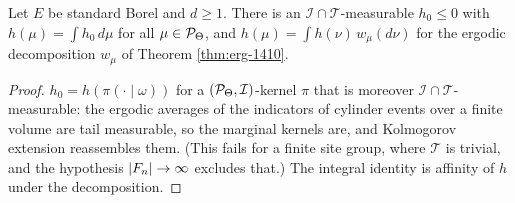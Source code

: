 \begin{theorem}[Georgii (15.20)]
    \label{thm:sent-15-20}
    \leanok

    Let $E$ be standard Borel and $d \geq 1$. There is an
    $\mathcal I \cap \mathcal T$-measurable $h_0 \leq 0$ with $h(\mu) = \int h_0\,d\mu$ for all
    $\mu \in \mathcal{P}_\Theta$, and $h(\mu) = \int h(\nu)\,w_\mu(d\nu)$ for the ergodic decomposition
    $w_\mu$ of Theorem \ref{thm:erg-1410}.
\end{theorem}
\begin{proof}
    \leanok
    $h_0 = h(\pi(\cdot \mid \omega))$ for a $(\mathcal{P}_\Theta, \mathcal I)$-kernel $\pi$ that is
    moreover $\mathcal I \cap \mathcal T$-measurable: the ergodic averages of the indicators of
    cylinder events over a finite volume are tail measurable, so the marginal kernels are, and
    Kolmogorov extension reassembles them. (This fails for a finite site group, where
    $\mathcal T$ is trivial, and the hypothesis $\lvert F_n\rvert \to \infty$ excludes that.) The
    integral identity is affinity of $h$ under the decomposition.
\end{proof}
